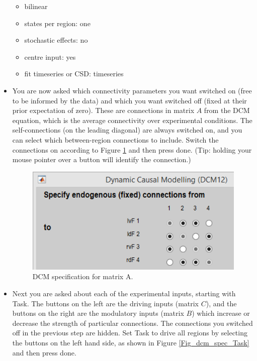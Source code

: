 \documentclass{article}
\begin{document}
\begin{itemize}
\begin{itemize}
    \item bilinear
    \item states per region: one
    \item stochastic effects: no
    \item centre input: yes
    \item fit timeseries or CSD: timeseries
\end{itemize}

\item You are now asked which connectivity parameters you want switched on (free to be informed by the data) and which you want switched off (fixed at their prior expectation of zero). These are connections in matrix \(A\) from the DCM equation, which is the average connectivity over experimental conditions. The self-connections (on the leading diagonal) are always switched on, and you can select which between-region connections to include. Switch the connections on according to Figure \ref{Fig_dcm_spec_A} and then press done. (Tip: holding your mouse pointer over a button will identify the connection.)

\begin{figure}[ht]
\begin{center}
\includegraphics{"Fig_dcm_spec_A"}
\caption{DCM specification for matrix A.\label{Fig_dcm_spec_A}}
\end{center}
\end{figure}

\item Next you are asked about each of the experimental inputs, starting with Task. The buttons on the left are the driving inputs (matrix \(C\)), and the buttons on the right are the modulatory inputs (matrix \(B\)) which increase or decrease the strength of particular connections. The connections you switched off in the previous step are hidden. Set Task to drive all regions by selecting the buttons on the left hand side, as shown in Figure \ref{Fig_dcm_spec_Task} and then press done.


\end{itemize}
\end{document}

